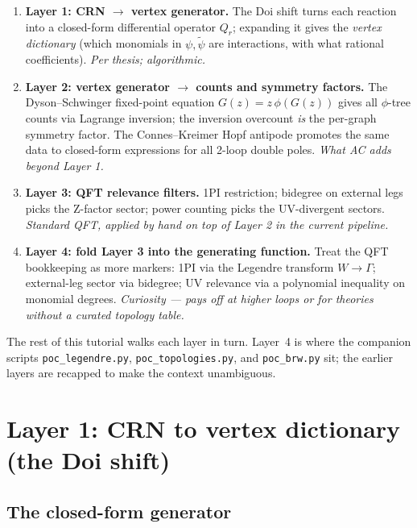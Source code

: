 \documentclass[11pt,a4paper]{article}
\begin{document}
\begin{layerbox}
\begin{enumerate}[leftmargin=2em,itemsep=4pt]
  \item \textbf{Layer 1: CRN $\to$ vertex generator.} The Doi shift turns each
        reaction into a closed-form differential operator $Q_r$; expanding it
        gives the \emph{vertex dictionary} (which monomials in $\psi,\tilde\psi$
        are interactions, with what rational coefficients). \emph{Per thesis;
        algorithmic.}
  \item \textbf{Layer 2: vertex generator $\to$ counts and symmetry factors.}
        The Dyson--Schwinger fixed-point equation $G(z)=z\,\phi(G(z))$ gives
        all $\phi$-tree counts via Lagrange inversion; the inversion overcount
        \emph{is} the per-graph symmetry factor. The Connes--Kreimer Hopf
        antipode promotes the same data to closed-form expressions for all
        2-loop double poles. \emph{What AC adds beyond Layer 1.}
  \item \textbf{Layer 3: QFT relevance filters.} 1PI restriction; bidegree on
        external legs picks the Z-factor sector; power counting picks the
        UV-divergent sectors. \emph{Standard QFT, applied by hand on top of
        Layer 2 in the current pipeline.}
  \item \textbf{Layer 4: fold Layer 3 into the generating function.} Treat the
        QFT bookkeeping as more markers: 1PI via the Legendre transform
        $W \to \Gamma$; external-leg sector via bidegree; UV relevance via a
        polynomial inequality on monomial degrees. \emph{Curiosity --- pays off
        at higher loops or for theories without a curated topology table.}
\end{enumerate}
\end{layerbox}

The rest of this tutorial walks each layer in turn. Layer~4 is where the
companion scripts \texttt{poc\_legendre.py}, \texttt{poc\_topologies.py},
and \texttt{poc\_brw.py} sit; the earlier layers are recapped to make the
context unambiguous.

\section{Layer 1: CRN to vertex dictionary (the Doi shift)}

\subsection{The closed-form generator}
\end{document}
